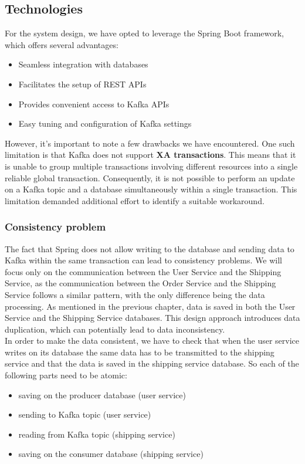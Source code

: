 \documentclass[11pt]{article}
\begin{document}
\subsection{Technologies}

For the system design, we have opted to leverage the Spring Boot framework, which offers several advantages:

\begin{itemize}
    \item Seamless integration with databases
    \item Facilitates the setup of REST APIs
    \item Provides convenient access to Kafka APIs
    \item Easy tuning and configuration of Kafka settings
\end{itemize}

However, it's important to note a few drawbacks we have encountered. One such limitation is that Kafka does not support \textbf{XA transactions}. This means that it is unable to group multiple transactions involving different resources into a single reliable global transaction. Consequently, it is not possible to perform an update on a Kafka topic and a database simultaneously within a single transaction. 
This limitation demanded additional effort to identify a suitable workaround.

\subsubsection{Consistency problem}
The fact that Spring does not allow writing to the database and sending data to Kafka within the same transaction can lead to consistency problems.
We will focus only on the communication between the User Service and the Shipping Service, as the communication between the Order Service and the Shipping Service follows a similar pattern, with the only difference being the data processing.
As mentioned in the previous chapter, data is saved in both the User Service and the Shipping Service databases. This design approach introduces data duplication, which can potentially lead to data inconsistency. \\ 
In order to make the data consistent, we have to check that when the user service writes on its database the same data has to be transmitted to the shipping service and that the data is saved in the shipping service database. So each of the following parts need to be atomic:
\begin{itemize}
    \item saving on the producer database (user service)
    \item sending to Kafka topic (user service)
    \item reading from Kafka topic  (shipping service)
    \item saving on the consumer database (shipping service)
\end{itemize}
\end{document}
